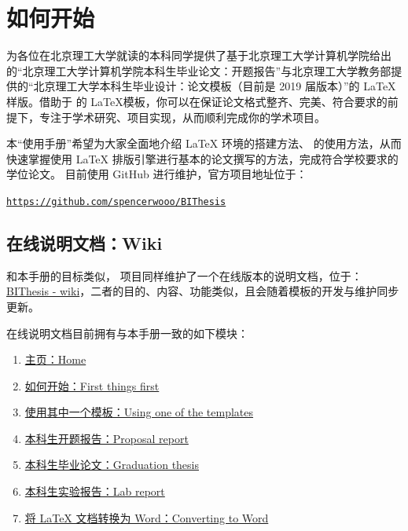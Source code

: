 \section{如何开始}
{\BIThesis} 为各位在北京理工大学就读的本科同学提供了基于北京理工大学计算机学院给出的“北京理工大学计算机学院本科生毕业论文：开题报告”与北京理工大学教务部提供的“北京理工大学本科生毕业设计：论文模板（目前是 2019 届版本）”的 \LaTeX 样版。借助于 {\BIThesis} 的 \LaTeX 模板，你可以在保证论文格式整齐、完美、符合要求的前提下，专注于学术研究、项目实现，从而顺利完成你的学术项目。

本“使用手册”希望为大家全面地介绍 {\LaTeX} 环境的搭建方法、{\BIThesis} 的使用方法，从而快速掌握使用 {\LaTeX} 排版引擎进行基本的论文撰写的方法，完成符合学校要求的学位论文。{\BIThesis} 目前使用 GitHub 进行维护，官方项目地址位于：

\begin{center}
\color{ForestGreen}\href{https://github.com/spencerwooo/BIThesis}{\texttt{https://github.com/spencerwooo/BIThesis}}
\end{center}

\subsection{在线说明文档：Wiki}
和本手册的目标类似，{\BIThesis} 项目同样维护了一个在线版本的说明文档，位于：{\href{https://github.com/spencerwooo/BIThesis/wiki}{BIThesis - wiki}}，二者的目的、内容、功能类似，且会随着模板的开发与维护同步更新。

{\BIThesis} 在线说明文档目前拥有与本手册一致的如下模块：

\begin{enumerate}
\item \href{https://github.com/spencerwooo/BIThesis/wiki}{主页：Home}
\item \href{https://github.com/spencerwooo/BIThesis/wiki/First-things-first}{如何开始：First things first }
\item \href{https://github.com/spencerwooo/BIThesis/wiki/Using-one-of-the-templates}{使用其中一个模板：Using one of the templates}
\item \href{https://github.com/spencerwooo/BIThesis/wiki/Proposal-Report}{本科生开题报告：Proposal report}
\item \href{https://github.com/spencerwooo/BIThesis/wiki/Final-Graduation-Thesis}{本科生毕业论文：Graduation thesis}
\item \href{https://github.com/spencerwooo/BIThesis/wiki/Lab-Report}{本科生实验报告：Lab report}
\item \href{https://github.com/spencerwooo/BIThesis/wiki/Converting-to-Word}{将 LaTeX 文档转换为 Word：Converting to Word}
\end{enumerate}

